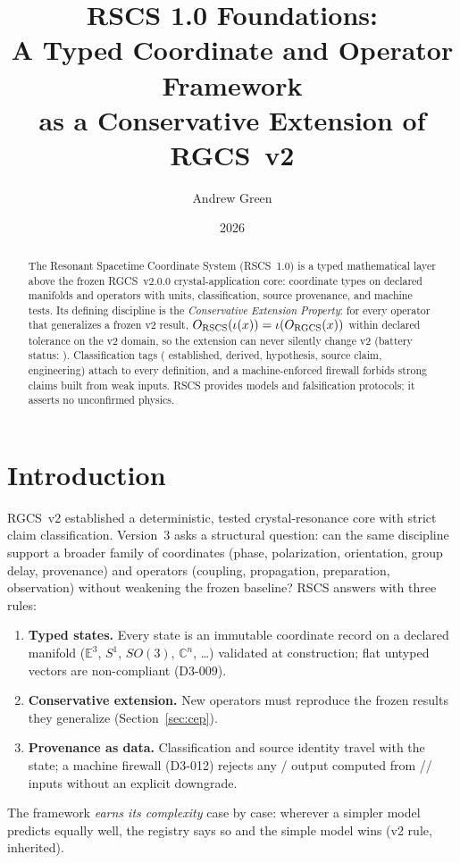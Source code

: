 \documentclass[10pt,letterpaper]{article}
\title{\vspace{-2.0em}\textbf{RSCS 1.0 Foundations:\\
A Typed Coordinate and Operator Framework\\
as a Conservative Extension of RGCS~v2}}
\author{Andrew Green}
\date{2026}
\begin{document}
\maketitle

\begin{abstract}
The Resonant Spacetime Coordinate System (RSCS~1.0) is a typed
mathematical layer above the frozen RGCS~v2.0.0 crystal-application core:
\gvNumCoords{} coordinate types on declared manifolds and \gvNumOps{}
operators with units, classification, source provenance, and machine
tests. Its defining discipline is the \emph{Conservative Extension
Property}: for every operator that generalizes a frozen v2 result,
$O_{\mathrm{RSCS}}(\iota(x)) = \iota(O_{\mathrm{RGCS}}(x))$ within
declared tolerance on the v2 domain, so the extension can never silently
change v2 (battery status: \gvCepAllOk). Classification tags (\EST{}
established, \DER{} derived, \HYP{} hypothesis, \SRC{} source claim,
\ENG{} engineering) attach to every definition, and a machine-enforced
firewall forbids strong claims built from weak inputs. RSCS provides
models and falsification protocols; it asserts no unconfirmed physics.
\end{abstract}

\section{Introduction}
RGCS~v2 established a deterministic, tested crystal-resonance core with
strict claim classification. Version~3 asks a structural question: can
the same discipline support a broader family of coordinates (phase,
polarization, orientation, group delay, provenance) and operators
(coupling, propagation, preparation, observation) without weakening the
frozen baseline? RSCS answers with three rules:
\begin{enumerate}
\item \textbf{Typed states.} Every state is an immutable coordinate
record on a declared manifold ($\mathbb{E}^3$, $S^1$, $SO(3)$,
$\mathbb{C}^n$, \dots) validated at construction; flat untyped vectors
are non-compliant (D3-009).
\item \textbf{Conservative extension.} New operators must reproduce the
frozen results they generalize (Section~\ref{sec:cep}).
\item \textbf{Provenance as data.} Classification and source identity
travel with the state; a machine firewall (D3-012) rejects any
\EST/\DER{} output computed from \HYP/\ENG/\SRC{} inputs without an
explicit downgrade.
\end{enumerate}
The framework \emph{earns its complexity} case by case: wherever a
simpler model predicts equally well, the registry says so and the simple
model wins (v2 rule, inherited).
\end{document}
